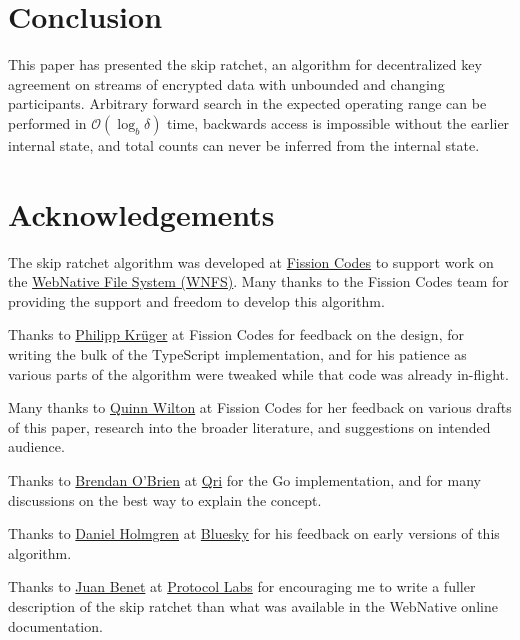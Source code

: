 \documentclass[twocolumn]{article}
\begin{document}
	\section{Conclusion}
	
	This paper has presented the skip ratchet, an algorithm for decentralized key agreement on streams of encrypted data with unbounded and changing participants. Arbitrary forward search in the expected operating range can be performed in $\mathcal{O}(\log_{b} \delta)$ time, backwards access is impossible without the earlier internal state, and total counts can never be inferred from the internal state.
    
    \section{Acknowledgements}
    
    The skip ratchet algorithm was developed at \href{https://fission.codes}{Fission Codes} to support work on the \href{https://github.com/fission-suite/webnative}{WebNative File System (WNFS)}. Many thanks to the Fission Codes team for providing the support and freedom to develop this algorithm.
    
    Thanks to \href{https://github.com/matheus23/}{Philipp Krüger} at Fission Codes for  feedback on the design, for writing the bulk of the TypeScript implementation\cite{ts-wnfs-ratchet}, and for his patience as various parts of the algorithm were tweaked while that code was already in-flight.
    
    Many thanks to \href{https://github.com/QuinnWilton}{Quinn Wilton} at Fission Codes for her feedback on various drafts of this paper, research into the broader literature, and suggestions on intended audience.
    
    Thanks to \href{https://github.com/b5/}{Brendan O'Brien} at \href{https://qri.io/}{Qri} for the {Go implementation}\cite{go-wnfs-ratchet}, and for many discussions on the best way to explain the concept.
    
    Thanks to \href{https://github.com/dholms}{Daniel Holmgren} at \href{https://blueskyweb.xyz}{Bluesky} for his feedback on early versions of this algorithm.
    
    Thanks to \href{https://github.com/jbenet/}{Juan Benet} at \href{https://protocol.ai/}{Protocol Labs} for encouraging me to write a fuller description of the skip ratchet than what was available in the WebNative online documentation.

    \printbibliography[title={References}]
\end{document}
